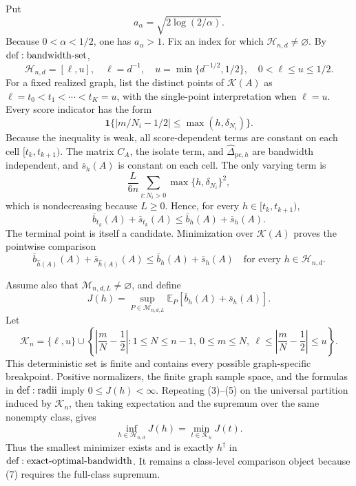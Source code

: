 Put
\[
 a_\alpha=\sqrt{2\log(2/\alpha)}.
\tag{1}
\]
Because \(0<\alpha<1/2\), one has \(a_\alpha>1\).  Fix an index for which \(\mathcal H_{n,d}\ne\varnothing\).  By \({\rm def:bandwidth\text{-}set}\),
\[
 \mathcal H_{n,d}=[\ell,u],\quad
 \ell=d^{-1},\quad u=\min\{d^{-1/2},1/2\},
 \quad0<\ell\leq u\leq1/2.
\tag{2}
\]
For a fixed realized graph, list the distinct points of \(\mathcal K(A)\) as \(\ell=t_0<t_1<\cdots<t_K=u\), with the single-point interpretation when \(\ell=u\).  Every score indicator has the form
\[
 \mathbf1\{|m/N_i-1/2|\leq\max(h,\delta_{N_i})\}.
\tag{3}
\]
Because the inequality is weak, all score-dependent terms are constant on each cell \([t_k,t_{k+1})\).  The matrix \(C_A\), the isolate term, and \(\widehat\Delta_{\mathrm{pc},h}\) are bandwidth independent, and \(\overline s_h(A)\) is constant on each cell.  The only varying term is
\[
 \frac{L}{6n}\sum_{i:N_i>0}\max\{h,\delta_{N_i}\}^2,
\tag{4}
\]
which is nondecreasing because \(L\geq0\).  Hence, for every \(h\in[t_k,t_{k+1})\),
\[
 \overline b_{t_k}(A)+\overline s_{t_k}(A)
 \leq\overline b_h(A)+\overline s_h(A).
\tag{5}
\]
The terminal point is itself a candidate.  Minimization over \(\mathcal K(A)\) proves the pointwise comparison
\[
 \overline b_{\widehat h(A)}(A)+\overline s_{\widehat h(A)}(A)
 \leq\overline b_h(A)+\overline s_h(A)
 \quad\text{for every }h\in\mathcal H_{n,d}.
\tag{6}
\]

Assume also that \(\mathcal M_{n,d,L}\ne\varnothing\), and define
\[
 J(h)=\sup_{P\in\mathcal M_{n,d,L}}
 \mathbb E_P[\overline b_h(A)+\overline s_h(A)].
\tag{7}
\]
Let
\[
 \mathcal K_n=\{\ell,u\}\cup
 \left\{\left|\frac mN-\frac12\right|:
 1\leq N\leq n-1,\ 0\leq m\leq N,\
 \ell\leq\left|\frac mN-\frac12\right|\leq u\right\}.
\tag{8}
\]
This deterministic set is finite and contains every possible graph-specific breakpoint.  Positive normalizers, the finite graph sample space, and the formulas in \({\rm def:radii}\) imply \(0\leq J(h)<\infty\).  Repeating (3)--(5) on the universal partition induced by \(\mathcal K_n\), then taking expectation and the supremum over the same nonempty class, gives
\[
 \inf_{h\in\mathcal H_{n,d}}J(h)=\min_{t\in\mathcal K_n}J(t).
\tag{9}
\]
Thus the smallest minimizer exists and is exactly \(h^\dagger\) in \({\rm def:exact\text{-}optimal\text{-}bandwidth}\).  It remains a class-level comparison object because (7) requires the full-class supremum.


